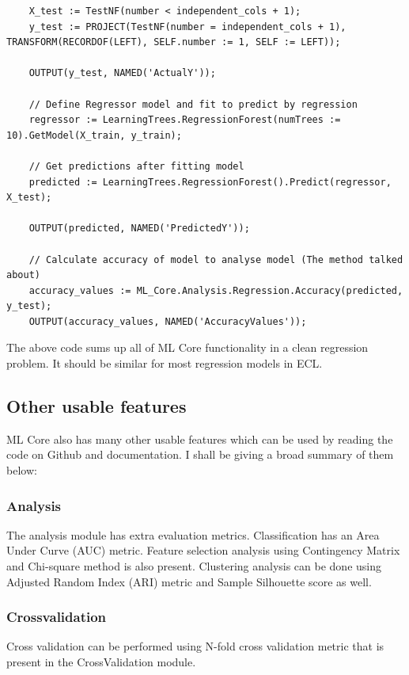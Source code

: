 \documentclass[a4paper,oneside,12pt]{book}
\begin{document}
\begin{lstlisting}
    X_test := TestNF(number < independent_cols + 1);
    y_test := PROJECT(TestNF(number = independent_cols + 1), TRANSFORM(RECORDOF(LEFT), SELF.number := 1, SELF := LEFT));
    
    OUTPUT(y_test, NAMED('ActualY'));
    
    // Define Regressor model and fit to predict by regression
    regressor := LearningTrees.RegressionForest(numTrees := 10).GetModel(X_train, y_train);

    // Get predictions after fitting model
    predicted := LearningTrees.RegressionForest().Predict(regressor, X_test);
    
    OUTPUT(predicted, NAMED('PredictedY'));
    
    // Calculate accuracy of model to analyse model (The method talked about)
    accuracy_values := ML_Core.Analysis.Regression.Accuracy(predicted, y_test);
    OUTPUT(accuracy_values, NAMED('AccuracyValues'));
\end{lstlisting}

The above code sums up all of ML Core functionality in a clean regression problem. It should be similar for most regression models in ECL.

\subsection{Other usable features}

ML Core also has many other usable features which can be used by reading the code on Github and documentation. I shall be giving a broad summary of them below:

\subsubsection{Analysis}

The analysis module has extra evaluation metrics. Classification has an Area Under Curve (AUC) metric. Feature selection analysis using Contingency Matrix and Chi-square method is also present. Clustering analysis can be done using Adjusted Random Index (ARI) metric and Sample Silhouette score as well.

\subsubsection{Crossvalidation}

Cross validation can be performed using N-fold cross validation metric that is present in the CrossValidation module.
\end{document}
